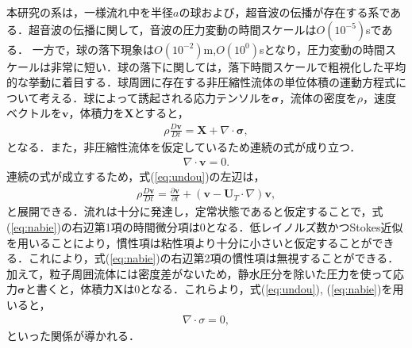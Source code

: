 本研究の系は，一様流れ中を半径$a$の球および，超音波の伝播が存在する系である．超音波の伝播に関して，音波の圧力変動の時間スケールは$O\left(10^{-5}\right)$sである．
一方で，球の落下現象は$O\left(10^{-2}\right)$m,$O\left(10^{0}\right)$sとなり，圧力変動の時間スケールは非常に短い．球の落下に関しては，落下時間スケールで粗視化した平均的な挙動に着目する．球周囲に存在する非圧縮性流体の単位体積の運動方程式について考える．球によって誘起される応力テンソルを$\bm{\sigma}$，流体の密度を$\rho$，速度ベクトルを$\bm{v}$，体積力を$\bm{X}$とすると，
\begin{eqnarray}
    \rho \frac{D\bm{v}}{Dt} = \bm{X} + \nabla \cdot \bm{\sigma} ,
    \label{eq:undou}
\end{eqnarray}
となる．また，非圧縮性流体を仮定しているため連続の式が成り立つ．
\begin{eqnarray}
    \nabla \cdot \bm{v} = 0 .
    \label{eq:renzoku}
\end{eqnarray}
連続の式が成立するため，式(\ref{eq:undou})の左辺は，
\begin{eqnarray}
    \rho \frac{D\bm{v}}{Dt} = \frac{\partial \bm{v}}{\partial t} + \left(\bm{v} - \bm{U}_T \cdot \nabla \right) \bm{v} ,
    \label{eq:nabie}
\end{eqnarray}
と展開できる．流れは十分に発達し，定常状態であると仮定することで，式(\ref{eq:nabie})の右辺第1項の時間微分項は0となる．低レイノルズ数かつStokes近似を用いることにより，慣性項は粘性項より十分に小さいと仮定することができる．これにより，式(\ref{eq:nabie})の右辺第2項の慣性項は無視することができる．加えて，粒子周囲流体には密度差がないため，静水圧分を除いた圧力を使って応力${\bm \sigma}$と書くと，体積力${\bm X}$は0となる．これらより，式(\ref{eq:undou}), (\ref{eq:nabie})を用いると，
\begin{eqnarray}
    \nabla \cdot \sigma = 0 ,
    \label{eq:sigma-}
\end{eqnarray}
といった関係が導かれる．


